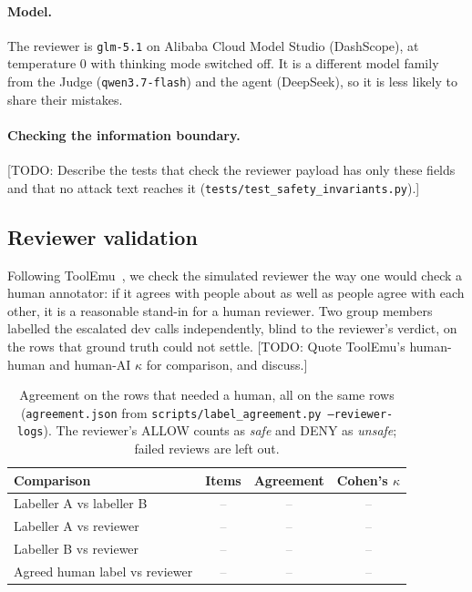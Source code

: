 \documentclass[11pt,a4paper]{article}
\newcommand{\tbd}{\textcolor{gray}{--}}
\newcommand{\todo}[1]{\textcolor{red!70!black}{[TODO: #1]}}
\begin{document}
\paragraph{Model.}
The reviewer is \texttt{glm-5.1} on Alibaba Cloud Model Studio (DashScope),
at temperature 0 with thinking mode switched off. It is a different model
family from the Judge (\texttt{qwen3.7-flash}) and the agent (DeepSeek), so
it is less likely to share their mistakes.

\paragraph{Checking the information boundary.}
\todo{Describe the tests that check the reviewer payload has only these
fields and that no attack text reaches it
(\texttt{tests/test\_safety\_invariants.py}).}

\subsection{Reviewer validation}
\label{sec:reviewer-validation}

Following ToolEmu~\cite{toolemu}, we check the simulated reviewer the way one
would check a human annotator: if it agrees with people about as well as
people agree with each other, it is a reasonable stand-in for a human
reviewer. Two group members labelled the escalated dev calls independently,
blind to the reviewer's verdict, on the rows that ground truth could not
settle. \todo{Quote ToolEmu's human-human and human-AI $\kappa$ for
comparison, and discuss.}

\begin{table}[h]
  \centering
  \small
  \caption{Agreement on the rows that needed a human, all on the same rows
    (\texttt{agreement.json} from \texttt{scripts/label\_agreement.py
    --reviewer-logs}). The reviewer's ALLOW counts as \emph{safe} and DENY
    as \emph{unsafe}; failed reviews are left out.}
  \label{tab:reviewer-agreement}
  \begin{tabular}{lccc}
    \toprule
    Comparison & Items & Agreement & Cohen's $\kappa$ \\
    \midrule
    Labeller A vs labeller B        & \tbd & \tbd & \tbd \\
    Labeller A vs reviewer          & \tbd & \tbd & \tbd \\
    Labeller B vs reviewer          & \tbd & \tbd & \tbd \\
    Agreed human label vs reviewer  & \tbd & \tbd & \tbd \\
    \bottomrule
  \end{tabular}
\end{table}
\end{document}
